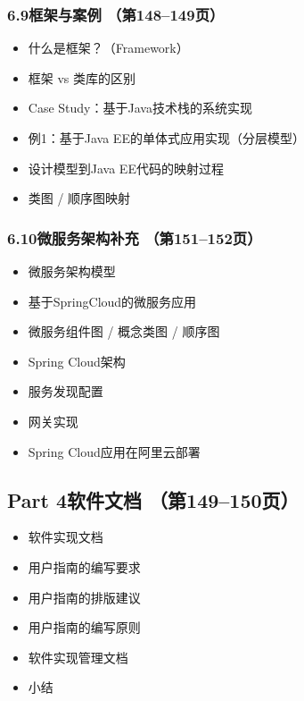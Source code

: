 \documentclass[12pt,a4paper]{ctexart}
\begin{document}
\subsubsection{6.9\quad 框架与案例 \hfill（第148--149页）}
\begin{itemize}
    \item 什么是框架？（Framework）
    \item 框架 vs 类库的区别
    \item Case Study：基于Java技术栈的系统实现
    \item 例1：基于Java EE的单体式应用实现（分层模型）
    \item 设计模型到Java EE代码的映射过程
    \item 类图 / 顺序图映射
\end{itemize}

\subsubsection{6.10\quad 微服务架构补充 \hfill（第151--152页）}
\begin{itemize}
    \item 微服务架构模型
    \item 基于SpringCloud的微服务应用
    \item 微服务组件图 / 概念类图 / 顺序图
    \item Spring Cloud架构
    \item 服务发现配置
    \item 网关实现
    \item Spring Cloud应用在阿里云部署
\end{itemize}

\subsection{Part 4\quad 软件文档 \hfill（第149--150页）}
\begin{itemize}
    \item 软件实现文档
    \item 用户指南的编写要求
    \item 用户指南的排版建议
    \item 用户指南的编写原则
    \item 软件实现管理文档
    \item 小结
\end{itemize}

\vspace{0.3cm}
\end{document}
